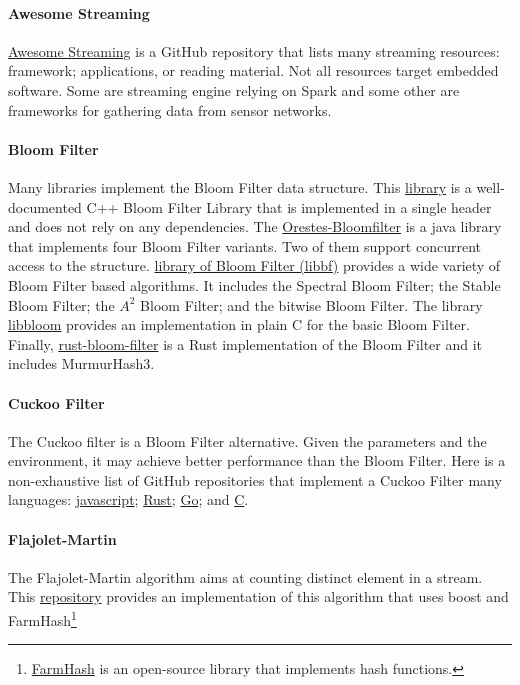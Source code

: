 \documentclass{article}
\begin{document}
\paragraph{Awesome Streaming}
	\href{https://github.com/manuzhang/awesome-streaming}{Awesome Streaming} is a GitHub repository that lists many streaming resources:
	framework; applications, or reading material.
	Not all resources target embedded software. Some are streaming engine relying on Spark and some other are frameworks for gathering
	data from sensor networks.

\paragraph{Bloom Filter}
	Many libraries implement the Bloom Filter data structure.
	This \href{http://www.partow.net/programming/bloomfilter/index.html}{library} is a
	well-documented C++ Bloom Filter Library that is implemented in a single header
	and does not rely on any dependencies.
	The \href{https://github.com/Baqend/Orestes-Bloomfilter}{Orestes-Bloomfilter}
	is a java library that implements four Bloom Filter variants.
	Two of them support concurrent access to the structure.
	\href{http://matthias.vallentin.net/blog/2011/06/a-garden-variety-of-bloom-filters/}{library of Bloom Filter (libbf)}
	provides a wide variety of Bloom Filter based algorithms. It includes the Spectral Bloom Filter; the Stable Bloom Filter; the $A^2$ Bloom Filter; and
	the bitwise Bloom Filter.
	The library \href{https://github.com/jvirkki/libbloom}{libbloom} provides an implementation in plain C for the basic Bloom Filter.
	Finally, \href{https://github.com/brianmadden/rust-bloom-filter}{rust-bloom-filter} is a Rust implementation of the Bloom Filter
	and it includes MurmurHash3.

\paragraph{Cuckoo Filter}
	The Cuckoo filter is a Bloom Filter alternative. Given the parameters and the environment,
	it may achieve better performance than the Bloom Filter.
	Here is a non-exhaustive list of GitHub repositories that implement a Cuckoo Filter many languages: \href{https://github.com/vijayee/cuckoo-filter}{javascript};
	\href{https://github.com/seiflotfy/rust-cuckoofilter}{Rust};
	\href{https://github.com/seiflotfy/cuckoofilter}{Go};
	and \href{https://github.com/begeekmyfriend/CuckooFilter}{C}. 

\paragraph{Flajolet-Martin}
	The Flajolet-Martin algorithm aims at counting distinct element in a stream.
	This \href{https://github.com/svengato/FlajoletMartin}{repository} provides
	an implementation of this algorithm that uses boost and
	FarmHash\footnote{\href{https://github.com/google/farmhash}{FarmHash} is an open-source library that implements hash functions.}
\end{document}
